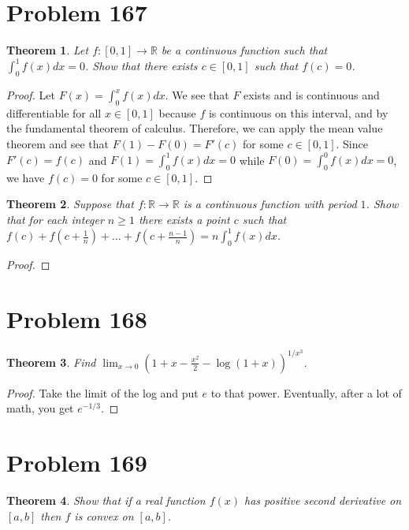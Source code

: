\documentclass[psamsfonts]{amsart}
\newtheorem{thm}{Theorem}[section]
\theoremstyle{definition}
\theoremstyle{remark}
\numberwithin{equation}{section}
\begin{document}
\section{Problem 167}

\begin{thm}
Let $f: [0,1] \to \mathbb{R}$ be a continuous function such that $\int_0^1 f(x) dx = 0$. Show that there exists $c \in [0,1]$ such that $f(c) = 0$. 
\end{thm}

\begin{proof}
Let $F(x) = \int_0^x f(x) dx$. We see that $F$ exists and is continuous and differentiable for all $x \in [0,1]$ because $f$ is continuous on this interval, and by the fundamental theorem of calculus. Therefore, we can apply the mean value theorem and see that $F(1) - F(0) = F'(c)$ for some $c \in [0,1]$. Since $F'(c) = f(c)$ and $F(1) = \int_0^1 f(x) dx = 0$ while $F(0) = \int_0^0 f(x) dx = 0$, we have $f(c) = 0$ for some $c \in [0,1]$.
\end{proof}

\begin{thm}
Suppose that $f: \mathbb{R} \to \mathbb{R}$ is a continuous function with period $1$. Show that for each integer $n \geq 1$ there exists a point $c$ such that $f(c) + f(c + \frac{1}{n}) + \ldots + f(c + \frac{n-1}{n}) = n \int_0^1 f(x) dx$. 
\end{thm}

\begin{proof}

\end{proof}

\section{Problem 168}

\begin{thm}
Find $\lim_{x \to 0} (1+ x - \frac{x^2}{2} - \log(1 + x))^{1/x^3}$. 
\end{thm}

\begin{proof}
Take the limit of the log and put $e$ to that power. Eventually, after a lot of math, you get $e^{-1/3}$. 
\end{proof}

\section{Problem 169}

\begin{thm}
Show that if a real function $f(x)$ has positive second derivative on $[a,b]$ then $f$ is convex on $[a,b]$. 
\end{thm}
\end{document}
